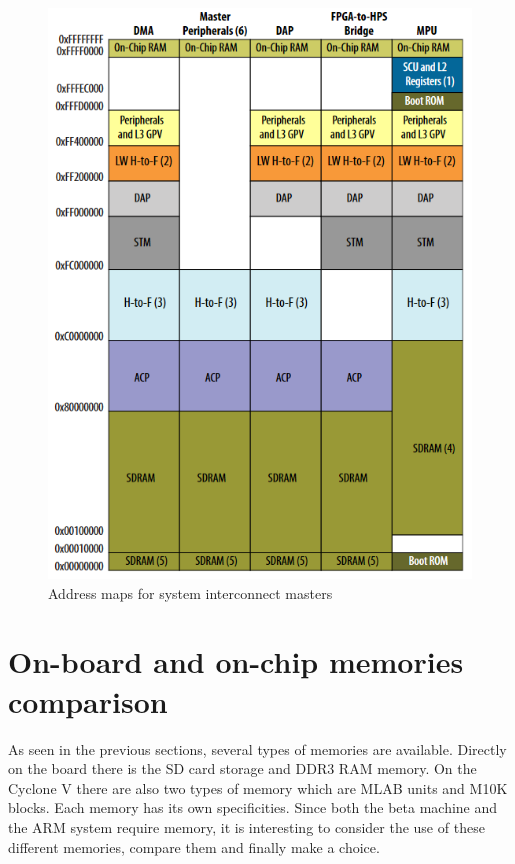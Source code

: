 \begin{figure}[H]
    \centering
    \includegraphics[scale=0.6]{Chapter1-Hardware/res/hps_address_space.PNG}
    \caption{Address maps for system interconnect masters}
    \label{fig:cyc5/address_space}
\end{figure}

\section{On-board and on-chip memories comparison}

As seen in the previous sections, several types of memories are available. Directly on the board 
there is the SD card storage and DDR3 RAM memory. On the Cyclone V there are also two types of memory 
which are MLAB units and M10K blocks. Each memory has its own specificities. Since both the beta 
machine and the ARM system require memory, it is interesting to consider the use of these different 
memories, compare them and finally make a choice.

